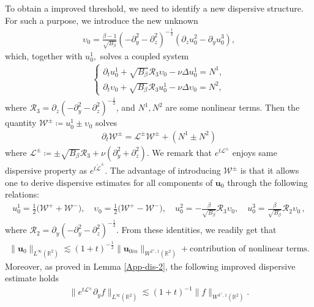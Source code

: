 \documentclass[11pt,reqno]{article}
\numberwithin{equation}{section}
\newcommand\R{{\mathbb R}}
\newcommand\W{{\mathcal W}}
\newcommand\up{\upsilon}
\newcommand\uu{\bm{u}}
\newcommand \tri {\coloneqq}
\let\pa=\partial
\let\f=\frac
\def \pt {\partial_t}
\def \cR {\mathcal{R}}
\begin{document}
To obtain a improved threshold, we need to identify a new dispersive structure.  For such a purpose, we introduce the new unknown
\begin{align*} 
\up_0
={\f{\beta-1}{\sqrt{B_\beta}}} (-\partial_y^2-\partial_z^2)^{-\f12} (\pa_z u_0^2-\pa_y u_0^3),
\end{align*}
which, together with $u_0^1,$ solves a coupled system
\begin{align*}
\left\{\begin{array}{l}
	\pt u_0^1+\sqrt{B_\beta}\mathcal{R}_3 \up_0-\nu\Delta u_0^1
	=N^1, 
	\\[1ex]
	\pt \up_0+\sqrt{B_\beta}\mathcal{R}_3u_0^1-\nu\Delta  \up_0
	=N^2,
    \end{array}\right.
\end{align*}
where $\cR_3=\partial_z(-\partial_y^2-\partial_z^2)^{-\f12}$, and
$N^{1}, N^{2}$ are some nonlinear terms.
Then the quantity $\W^{\pm}\tri u_0^1 \pm  \up_0$ 
solves
\begin{align*}
	\pt \W^{\pm}= 
	\mathcal{L}^{\pm}
	\W^{\pm}+(N^{1}\pm N^2) 
\end{align*}
where ${\mathcal{L}}^{\pm}\tri \pm \sqrt{B_{\beta}}\mathcal{R}_3 +\nu(\pa_y^2+\pa_z^2). $ We remark that 
$e^{t\mathcal{L}^{\pm}}$ enjoys same dispersive property as $e^{t\tilde{\mathcal{L}}^{\pm}}.$ 
The advantage of introducing
 $\W^{\pm}$ is that it allows one to derive dispersive estimates for all components of
 $\uu_0$ through the following relations: 
\begin{align*}
u_0^1 = \f12\big(\W^{+}+\W^{-}\big),
\quad
\up_0 = \f12\big(\W^{+}-\W^{-}\big),
\quad u_0^2={-\f{\beta}{\sqrt {B_\beta}}} \mathcal{R}_3\up_0,
\quad
u_0^3={\f{\beta}{\sqrt {B_\beta}}} \mathcal{R}_2\up_0\,,
\end{align*}
where $\cR_2=\partial_y(-\partial_y^2-\partial_z^2)^{-\f12}.$
From these identities, we readily get that 
\begin{align}\label{intro-dispes-2}
	\|\uu_0\|_{L^{\infty}(\R^2)}%
	\lesssim (1+t)^{-\f12} \|\uu_{0in}\|_{W^{2^+,1}(\R^2)}+\text{contribution of nonlinear terms.}
\end{align}
Moreover, as proved in Lemma \ref{App-dis-2}, the following improved dispersive estimate holds
\begin{align*}%
	\|e^{t{\mathcal{L}}^{\pm}}\pa_y f\|_{L^{\infty}(\R^2)}\lesssim (1+t)^{-1} \|f\|_{W^{3^{+},1}(\R^2)}.  %
\end{align*}
\end{document}

